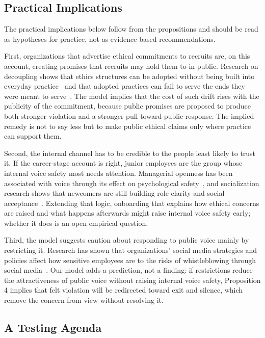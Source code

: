 \documentclass[12pt,a4paper]{article}
\theoremstyle{definition}
\begin{document}
\subsection{Practical Implications}

The practical implications below follow from the propositions and should be read as hypotheses for practice, not as evidence-based recommendations.

First, organizations that advertise ethical commitments to recruits are, on this account, creating promises that recruits may hold them to in public. Research on decoupling shows that ethics structures can be adopted without being built into everyday practice~\citep{weaver1999integrated} and that adopted practices can fail to serve the ends they were meant to serve~\citep{bromley2012smoke}. The model implies that the cost of such drift rises with the publicity of the commitment, because public promises are proposed to produce both stronger violation and a stronger pull toward public response. The implied remedy is not to say less but to make public ethical claims only where practice can support them.

Second, the internal channel has to be credible to the people least likely to trust it. If the career-stage account is right, junior employees are the group whose internal voice safety most needs attention. Managerial openness has been associated with voice through its effect on psychological safety~\citep{detert2007leadership}, and socialization research shows that newcomers are still building role clarity and social acceptance~\citep{bauer2007newcomer}. Extending that logic, onboarding that explains how ethical concerns are raised and what happens afterwards might raise internal voice safety early; whether it does is an open empirical question.

Third, the model suggests caution about responding to public voice mainly by restricting it. Research has shown that organizations' social media strategies and policies affect how sensitive employees are to the risks of whistleblowing through social media~\citep{xiao2022employee}. Our model adds a prediction, not a finding: if restrictions reduce the attractiveness of public voice without raising internal voice safety, Proposition 4 implies that felt violation will be redirected toward exit and silence, which remove the concern from view without resolving it.

\subsection{A Testing Agenda}
\end{document}
